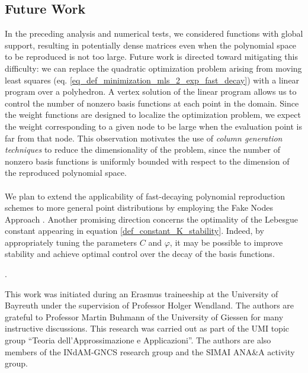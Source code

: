 \documentclass{drna}
\begin{document}
\subsection{Future Work}
In the preceding analysis and numerical tests, we considered functions with global support, resulting in potentially dense matrices even when the polynomial space to be reproduced is not too large. Future work is directed toward mitigating this difficulty: we can replace the quadratic optimization problem arising from moving least squares (eq. \eqref{eq_def_minimization_mls_2_exp_fast_decay}) with a linear program over a polyhedron. A vertex solution of the linear program allows us to control the number of nonzero basis functions at each point in the domain. Since the weight functions are designed to localize the optimization problem, we expect the weight corresponding to a given node to be large when the evaluation point is far from that node. This observation motivates the use of \textit{column generation techniques} to reduce the dimensionality of the problem, since the number of nonzero basis functions is uniformly bounded with respect to the dimension of the reproduced polynomial space.
\\
\\
We plan to extend the applicability of fast-decaying polynomial reproduction schemes to more general point distributions by employing the Fake Nodes Approach \cite{demarchi_2021}. Another promising direction concerns the optimality of the Lebesgue constant appearing in equation \eqref{def_constant_K_stability}. Indeed, by appropriately tuning the parameters $C$ and $\varphi$, it may be possible to improve stability and achieve optimal control over the decay of the basis functions.
\vskip 0.1in 

. 

\noindent This work was initiated during an Erasmus traineeship at the University of Bayreuth under the supervision of Professor Holger Wendland. The authors are grateful to Professor Martin Buhmann of the University of Giessen for many instructive discussions. This research was carried out as part of the UMI topic group ``Teoria dell'Approssimazione e Applicazioni''. The authors are also members of the INdAM-GNCS research group and the SIMAI ANA\&A activity group.

\printbibliography %
%
\end{document}
